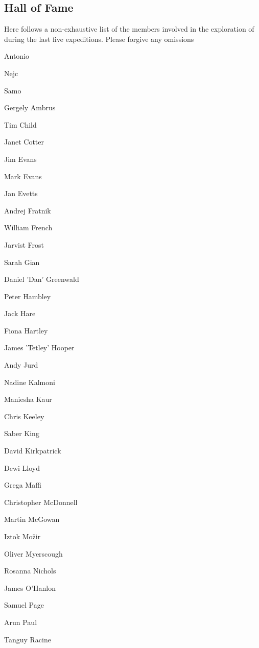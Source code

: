 \begin{tcolorbox}
\begin{fullwidth} 
\chapter{Hall of Fame} 

 Here follows a non-exhaustive list of the members involved in the exploration of  during the last five expeditions. Please forgive any omissions 

 \begin{multicols}{2} 
Antonio  
 
Nejc  
 
Samo  
 
Gergely Ambrus 
 
Tim Child 
 
Janet Cotter 
 
Jim Evans 
 
Mark Evans 
 
Jan Evetts 
 
Andrej Fratnik 
 
William French 
 
Jarvist Frost  
 
Sarah Gian 
 
Daniel 'Dan' Greenwald 
 
Peter Hambley 
 
Jack Hare 
 
Fiona Hartley 
 
James 'Tetley' Hooper 
 
Andy Jurd 
 
Nadine Kalmoni  
 
Maniesha Kaur 
 
Chris Keeley 
 
Saber King 
 
David Kirkpatrick 
 
Dewi Lloyd 
 
Grega Maffi 
 
Christopher McDonnell 
 
Martin McGowan 
 
Iztok Mo\v{z}ir  
 
Oliver Myerscough 
 
Rosanna Nichols  
 
James O'Hanlon 
 
Samuel Page 
 
Arun Paul  
 
Tanguy Racine 
 

\end{multicols}
\end{fullwidth}
\end{tcolorbox}
